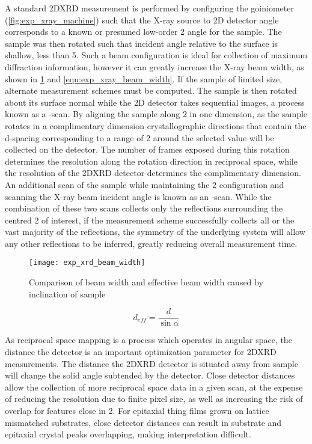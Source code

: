 A standard 2DXRD measurement is performed by configuring the goiniometer (\cref{fig:exp_xray_machine}) such that the X-ray source to 2D detector angle corresponds to a known or presumed low-order 2\straighttheta{} angle for the sample.
The sample was then rotated such that incident angle relative to the surface is shallow, less than 5\degree{}.
Such a beam configuration is ideal for collection of maximum diffraction information, however it can greatly increase the X-ray beam width, as shown in \cref{fig:exp_xray_beam_width} and \cref{eqn:exp_xray_beam_width}.
If the sample of limited size, alternate measurement schemes must be computed.
The sample is then rotated about its surface normal while the 2D detector takes sequential images, a process known as a \textphi{}-scan.
By aligning the sample along 2\straighttheta{} in one dimension, as the sample rotates in a complimentary dimension crystallographic directions that contain the d-spacing corresponding to a range of 2\straighttheta{} around the selected value will be collected on the detector.
The number of frames exposed during this rotation determines the resolution along the rotation direction in reciprocal space, while the resolution of the 2DXRD detector determines the complimentary dimension.
An additional scan of the sample while maintaining the 2\straighttheta{} configuration and scanning the X-ray beam incident angle is known as an \textomega{}-scan.
While the combination of these two scans collects only the reflections surrounding the centred 2\straighttheta{} of interest, if the measurement scheme successfully collects all or the vast majority of the reflections, the symmetry of the underlying system will allow any other reflections to be inferred, greatly reducing overall measurement time.
\begin{figure}
 \centering \texttt{[image: exp\_xrd\_beam\_width]}
 \caption[X-Ray Beam Width]{\label{fig:exp_xray_beam_width}Comparison of beam width and effective beam width caused by inclination of sample}
\end{figure}
\begin{equation}
 d_{eff} = \frac{d}{\sin{\alpha}} \label{eqn:exp_xray_beam_width}
\end{equation}

As reciprocal space mapping is a process which operates in angular space, the distance the detector is an important optimization parameter for 2DXRD measurements.
The distance the 2DXRD detector is situated away from sample will change the solid angle subtended by the detector.
Close detector distances allow the collection of more reciprocal space data in a given scan, at the expense of reducing the resolution due to finite pixel size, as well as increasing the risk of overlap for features close in 2\straighttheta{}.
For epitaxial thing films grown on lattice mismatched substrates, close detector distances can result in substrate and epitaxial crystal peaks overlapping, making interpretation difficult.

